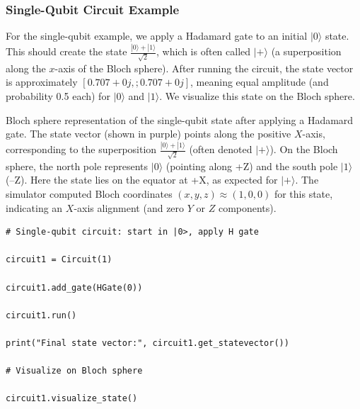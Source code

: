 \documentclass{beamer}
\begin{document}
\begin{frame}
\frametitle{Single-Qubit Circuit Example}

For the single-qubit example, we apply a Hadamard gate to an initial
$|0\rangle$ state. This should create the state
$\frac{|0\rangle +|1\rangle}{\sqrt{2}}$, which is often called $|+\rangle$ (a
superposition along the $x$-axis of the Bloch sphere). After running
the circuit, the state vector is approximately $[0.707+0j,;0.707+0j]$,
meaning equal amplitude (and probability 0.5 each) for $|0\rangle$ and
$|1\rangle$. We visualize this state on the Bloch sphere.

Bloch sphere representation of the single-qubit state after applying a
Hadamard gate. The state vector (shown in purple) points along the
positive $X$-axis, corresponding to the superposition $\frac{|0\rangle
+ |1\rangle}{\sqrt{2}}$ (often denoted $|+\rangle$). On the Bloch
sphere, the north pole represents $|0\rangle$ (pointing along +Z) and
the south pole $|1\rangle$ (–Z). Here the state lies on the equator at
+X, as expected for $|+\rangle$. The simulator computed Bloch
coordinates $(x,y,z) \approx (1,0,0)$ for this state, indicating an
$X$-axis alignment (and zero $Y$ or $Z$ components).
















\begin{verbatim}
# Single-qubit circuit: start in |0>, apply H gate

circuit1 = Circuit(1)

circuit1.add_gate(HGate(0))

circuit1.run()

print("Final state vector:", circuit1.get_statevector())

# Visualize on Bloch sphere

circuit1.visualize_state()


\end{verbatim}
\end{frame}
\end{document}

